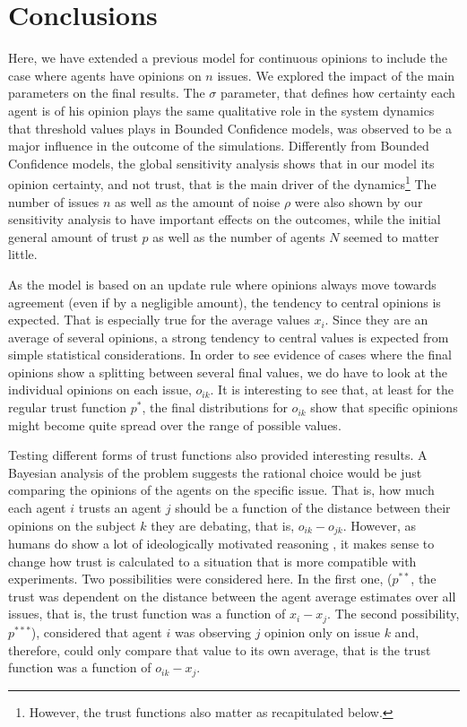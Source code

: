 \documentclass{article}
\begin{document}
    \section{Conclusions}

    Here, we have extended a previous model for continuous opinions
    \cite{martins08c} to include the case where agents have opinions on $n$
    issues. We explored the impact of the main parameters on the final results.
    The \(\sigma\) parameter, that defines how certainty each agent is of his
    opinion plays the same qualitative role in the system dynamics that
    threshold values plays in Bounded Confidence models, was observed to be a
    major influence in the outcome of the simulations. Differently from Bounded
    Confidence models, the global sensitivity analysis shows that in our model
    its opinion certainty, and not trust, that is the main driver of the
    dynamics\footnote{However, the trust functions also matter as recapitulated
      below.} The number of issues $n$ as well as the amount of noise $\rho$
    were also shown by our sensitivity analysis to have important effects on the
    outcomes, while the initial general amount of trust $p$ as well as the
    number of agents $N$ seemed to matter little.

    As the model is based on an update rule where opinions always move towards
    agreement (even if by a negligible amount), the tendency to central opinions
    is expected. That is especially true for the average values $x_i$. Since
    they are an average of several opinions, a strong tendency to central values
    is expected from simple statistical considerations. In order to see evidence
    of cases where the final opinions show a splitting between several final
    values, we do have to look at the individual opinions on each issue,
    $o_{ik}$. It is interesting to see that, at least for the regular trust
    function $p^*$, the final distributions for $o_{ik}$ show that specific
    opinions might become quite spread over the range of possible values.

    Testing different forms of trust functions also provided interesting
    results. A Bayesian analysis of the problem suggests the rational choice
    would be just comparing the opinions of the agents on the specific issue.
    That is, how much each agent $i$ trusts an agent $j$ should be a function of
    the distance between their opinions on the subject $k$ they are debating,
    that is, $o_{ik}-o_{jk}$. However, as humans do show a lot of ideologically
    motivated reasoning \cite{mercier11a,merciersperber11a,kahanetal11}, it
    makes sense to change how trust is calculated to a situation that is more
    compatible with experiments. Two possibilities were considered here. In the
    first one, (\( p^{**}\), the trust was dependent on the distance between the
    agent average estimates over all issues, that is, the trust function was a
    function of $x_{i}-x_{j}$. The second possibility, \( p^{***}\)), considered
    that agent $i$ was observing $j$ opinion only on issue $k$ and, therefore,
    could only compare that value to its own average, that is the trust function
    was a function of $o_{ik}-x_{j}$.
\end{document}
